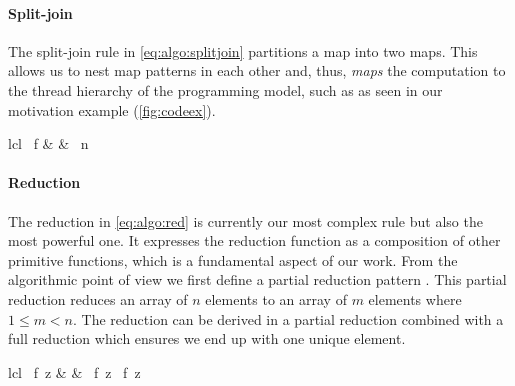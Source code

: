 \paragraph{Split-join}
The split-join rule in \autoref{eq:algo:splitjoin} partitions a map into two maps.
This allows us to nest map patterns in each other and, thus, \emph{maps} the computation to the thread hierarchy of the \OpenCL programming model, such as  as seen in our motivation example (\autoref{fig:codeex}).
%
\begin{rerule}{lcl}
  \ f
    & \rightarrow &
        \circ {}
        \circ {}\ n
  \label{eq:algo:splitjoin}
\end{rerule}


\paragraph{Reduction}
The reduction in \autoref{eq:algo:red} is currently our most complex rule but also the most powerful one.
It expresses the reduction function as a composition of other primitive functions, which is a fundamental aspect of our work.
From the algorithmic point of view we first define a partial reduction pattern .
This partial reduction reduces an array of $n$ elements to an array of $m$ elements where $1 \leq m < n$.
The reduction can be derived in a partial reduction combined with a full reduction which ensures we end up with one unique element.
%
\begin{rerule}{lcl}
  \ f\ z
    & \rightarrow &
      \ f\ z \circ {}\ f\ z
  \label{eq:algo:red}
\end{rerule}

